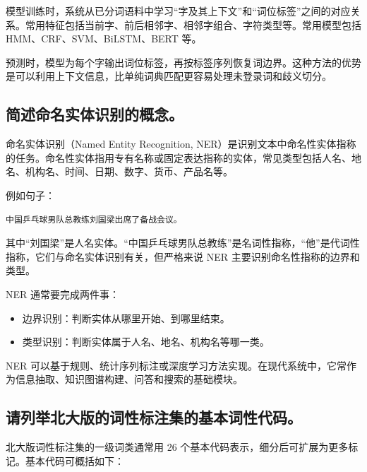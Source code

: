模型训练时，系统从已分词语料中学习“字及其上下文”和“词位标签”之间的对应关系。常用特征包括当前字、前后相邻字、相邻字组合、字符类型等。常用模型包括 HMM、CRF、SVM、BiLSTM、BERT 等。

预测时，模型为每个字输出词位标签，再按标签序列恢复词边界。这种方法的优势是可以利用上下文信息，比单纯词典匹配更容易处理未登录词和歧义切分。

\subsection{简述命名实体识别的概念。}

命名实体识别（Named Entity Recognition, NER）是识别文本中命名性实体指称的任务。命名性实体指用专有名称或固定表达指称的实体，常见类型包括人名、地名、机构名、时间、日期、数字、货币、产品名等。

例如句子：
\begin{verbatim}
中国乒乓球男队总教练刘国梁出席了备战会议。
\end{verbatim}

其中“刘国梁”是人名实体。“中国乒乓球男队总教练”是名词性指称，“他”是代词性指称，它们与命名实体识别有关，但严格来说 NER 主要识别命名性指称的边界和类型。

NER 通常要完成两件事：
\begin{itemize}
  \item 边界识别：判断实体从哪里开始、到哪里结束。
  \item 类型识别：判断实体属于人名、地名、机构名等哪一类。
\end{itemize}

NER 可以基于规则、统计序列标注或深度学习方法实现。在现代系统中，它常作为信息抽取、知识图谱构建、问答和搜索的基础模块。

\subsection{请列举北大版的词性标注集的基本词性代码。}

北大版词性标注集的一级词类通常用 26 个基本代码表示，细分后可扩展为更多标记。基本代码可概括如下：

